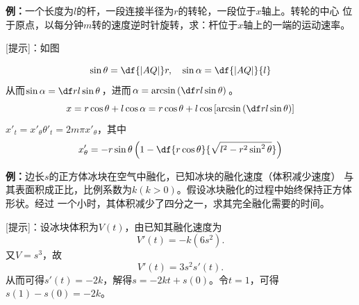 % 

{\bf 例：}一个长度为$l$的杆，一段连接半径为$r$的转轮，一段位于$x$轴上。转轮的中心
位于原点，以每分钟$m$转的速度逆时针旋转，求：杆位于$x$轴上的一端的运动速率。

[提示]：如图
\begin{center}
\end{center}
$$\sin\theta=\df{|AQ|}r,\quad \sin\alpha=\df{|AQ|}{l}$$
从而$\sin\alpha=\df rl\sin\theta$，进而$\alpha=\arcsin\left(
\df rl\sin\theta\right)$。
$$x=r\cos\theta+l\cos\alpha=r\cos\theta+l\cos
\left[\arcsin\left(\df rl\sin\theta\right)\right]$$
$x'_t=x'_{\theta}\theta'_t=2m\pi x'_{\theta}$，其中
$$x'_{\theta}
=-r\sin\theta\left(1-\df{r\cos\theta}{\sqrt{l^2-r^2\sin^2\theta}}\right)$$

{\bf 例：}边长$s$的正方体冰块在空气中融化，已知冰块的融化速度（体积减少速度）
与其表面积成正比，比例系数为$k(k>0)$。假设冰块融化的过程中始终保持正方体形状。经过
一个小时，其体积减少了四分之一，求其完全融化需要的时间。

[提示]：设冰块体积为$V(t)$，由已知其融化速度为
$$V'(t)=-k(6s^2).$$
又$V=s^3$，故
$$V'(t)=3s^2s'(t).$$
从而可得$s'(t)=-2k$，解得$s=-2kt+s(0)$。令$t=1$，可得$s(1)-s(0)=-2k$。

